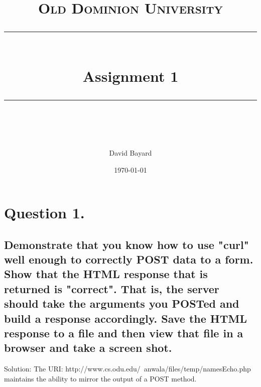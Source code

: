 \documentclass[11pt]{scrartcl} %
\title{	
	\normalfont\normalsize
	\textsc{Old Dominion University}\\ %
	\vspace{25pt} %
	\rule{\linewidth}{0.5pt}\\ %
	\vspace{20pt} %
	{\huge Assignment 1}\\ %
	\vspace{12pt} %
	\rule{\linewidth}{2pt}\\ %
	\vspace{12pt} %
}
\author{\LARGE David Bayard} %
\date{\normalsize\today} %
\begin{document}

\lstset{style=pythonStyle}


\maketitle %

\pagebreak
\section*{Question 1.}



\subsection*{Demonstrate that you know how to use "curl" well enough to
correctly POST data to a form.  Show that the HTML response that
is returned is "correct".  That is, the server should take the
arguments you POSTed and build a response accordingly.  Save the
HTML response to a file and then view that file in a browser and
take a screen shot.} 
\bigskip\bigskip


\LARGE Solution:
\newline \newline\small
The URI: http://www.cs.odu.edu/~anwala/files/temp/namesEcho.php \newline maintains the ability to mirror the output of a POST method. \newline
\end{document}
